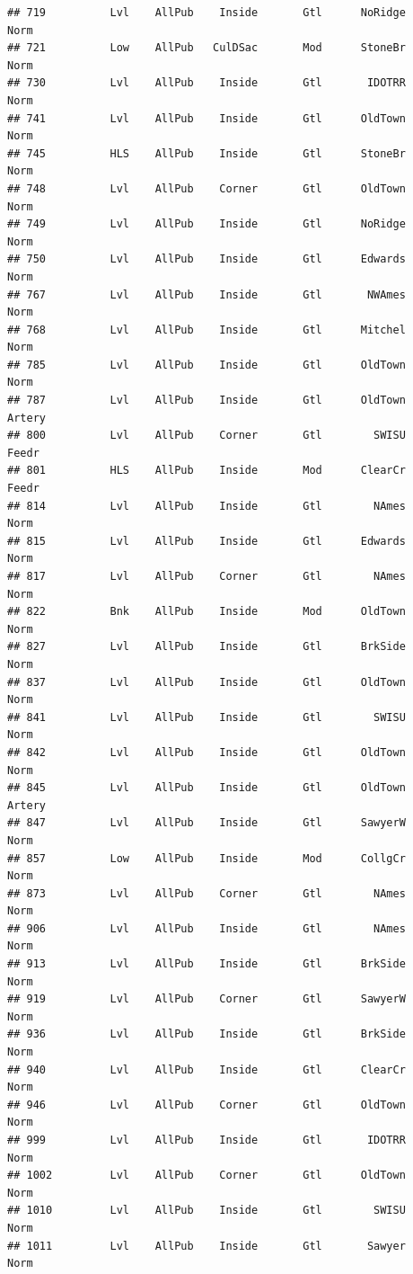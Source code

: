 \documentclass[]{article}
\begin{document}
\begin{verbatim}
## 719          Lvl    AllPub    Inside       Gtl      NoRidge       Norm
## 721          Low    AllPub   CulDSac       Mod      StoneBr       Norm
## 730          Lvl    AllPub    Inside       Gtl       IDOTRR       Norm
## 741          Lvl    AllPub    Inside       Gtl      OldTown       Norm
## 745          HLS    AllPub    Inside       Gtl      StoneBr       Norm
## 748          Lvl    AllPub    Corner       Gtl      OldTown       Norm
## 749          Lvl    AllPub    Inside       Gtl      NoRidge       Norm
## 750          Lvl    AllPub    Inside       Gtl      Edwards       Norm
## 767          Lvl    AllPub    Inside       Gtl       NWAmes       Norm
## 768          Lvl    AllPub    Inside       Gtl      Mitchel       Norm
## 785          Lvl    AllPub    Inside       Gtl      OldTown       Norm
## 787          Lvl    AllPub    Inside       Gtl      OldTown     Artery
## 800          Lvl    AllPub    Corner       Gtl        SWISU      Feedr
## 801          HLS    AllPub    Inside       Mod      ClearCr      Feedr
## 814          Lvl    AllPub    Inside       Gtl        NAmes       Norm
## 815          Lvl    AllPub    Inside       Gtl      Edwards       Norm
## 817          Lvl    AllPub    Corner       Gtl        NAmes       Norm
## 822          Bnk    AllPub    Inside       Mod      OldTown       Norm
## 827          Lvl    AllPub    Inside       Gtl      BrkSide       Norm
## 837          Lvl    AllPub    Inside       Gtl      OldTown       Norm
## 841          Lvl    AllPub    Inside       Gtl        SWISU       Norm
## 842          Lvl    AllPub    Inside       Gtl      OldTown       Norm
## 845          Lvl    AllPub    Inside       Gtl      OldTown     Artery
## 847          Lvl    AllPub    Inside       Gtl      SawyerW       Norm
## 857          Low    AllPub    Inside       Mod      CollgCr       Norm
## 873          Lvl    AllPub    Corner       Gtl        NAmes       Norm
## 906          Lvl    AllPub    Inside       Gtl        NAmes       Norm
## 913          Lvl    AllPub    Inside       Gtl      BrkSide       Norm
## 919          Lvl    AllPub    Corner       Gtl      SawyerW       Norm
## 936          Lvl    AllPub    Inside       Gtl      BrkSide       Norm
## 940          Lvl    AllPub    Inside       Gtl      ClearCr       Norm
## 946          Lvl    AllPub    Corner       Gtl      OldTown       Norm
## 999          Lvl    AllPub    Inside       Gtl       IDOTRR       Norm
## 1002         Lvl    AllPub    Corner       Gtl      OldTown       Norm
## 1010         Lvl    AllPub    Inside       Gtl        SWISU       Norm
## 1011         Lvl    AllPub    Inside       Gtl       Sawyer       Norm

\end{verbatim}
\end{document}
